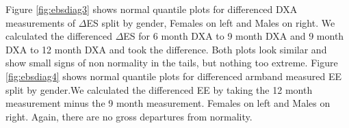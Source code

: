 \documentclass[11pt]{article}\usepackage[]{graphicx}\usepackage[]{color}
\begin{document}
Figure \ref{fig:ebsdiag3} shows normal quantile plots for differenced DXA measurements of $\Delta$ES split by gender, Females on left and Males on right. We calculated the differenced $\Delta$ES for 6 month DXA to 9 month DXA and 9 month DXA to 12 month DXA and took the difference. Both plots look similar and show small signs of non normality in the tails, but nothing too extreme. Figure \ref{fig:ebsdiag4} shows normal quantile plots for differenced armband measured EE split by gender.We calculated the differenced EE by taking the 12 month measurement minus the 9 month measurement. Females on left and Males on right. Again, there are no gross departures from normality. 

% 
% 
\end{document}
